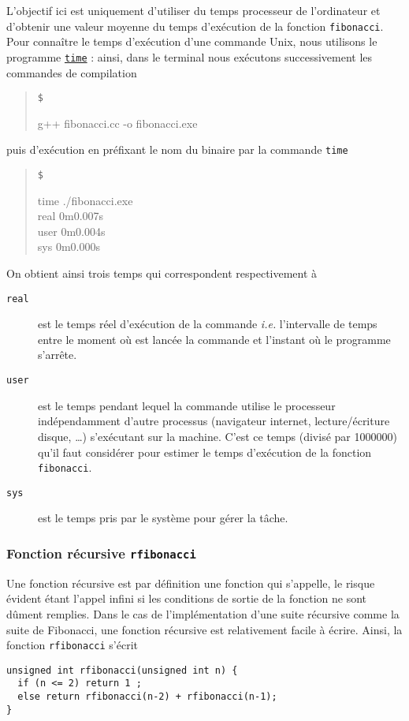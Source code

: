\documentclass{book}
\newenvironment{prompt}{\begin{quote}\color{blue!75}\tt\$\,
}{\end{quote}}
\begin{document}
\begin{correction}
L'objectif ici est uniquement d'utiliser du temps processeur de l'ordinateur
et d'obtenir une valeur moyenne du temps d'exécution de la fonction
\texttt{fibonacci}. Pour connaître le temps d'exécution d'une commande Unix, nous
utilisons le programme \href{https://en.wikipedia.org/wiki/Time_(Unix)}{\texttt{time}} : ainsi, dans le terminal nous exécutons
successivement les commandes de compilation
\begin{prompt}
g++ fibonacci.cc -o fibonacci.exe
\end{prompt}
puis d'exécution en préfixant le nom du binaire par la commande \texttt{time}
\begin{prompt}
time ./fibonacci.exe\\
real  0m0.007s\\
user  0m0.004s\\
sys   0m0.000s
\end{prompt}
On obtient ainsi trois temps qui correspondent respectivement à

\begin{description}
\item[{\texttt{real}}] est le temps réel d'exécution de la commande \emph{i.e.} l'intervalle de
temps entre le moment où est lancée la commande et l'instant où le
programme s'arrête.
\item[{\texttt{user}}] est le temps pendant lequel la commande utilise le processeur
indépendamment d'autre processus (navigateur internet, lecture/écriture disque, \ldots{}) s'exécutant sur
la machine. C'est ce temps (divisé par 1000000) qu'il faut considérer pour estimer le temps d'exécution de la fonction \texttt{fibonacci}.
\item[{\texttt{sys}}] est le temps pris par le système pour gérer la tâche.
\end{description}


\subsubsection{Fonction récursive \texttt{rfibonacci}}

Une fonction récursive est par définition une fonction qui s'appelle, le risque
évident étant l'appel infini si les conditions de sortie de la fonction ne sont
dûment remplies. Dans le cas de l'implémentation d'une suite récursive comme la
suite de Fibonacci, une fonction récursive est relativement facile à écrire.
Ainsi, la fonction \texttt{rfibonacci} s'écrit

\begin{verbatim}
unsigned int rfibonacci(unsigned int n) {
  if (n <= 2) return 1 ;
  else return rfibonacci(n-2) + rfibonacci(n-1);
}
\end{verbatim}


\end{correction}
\end{document}
